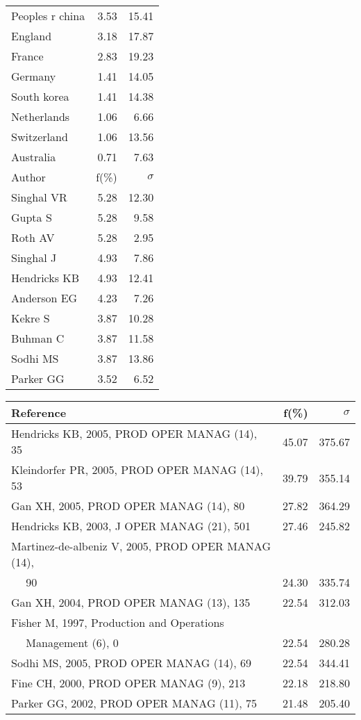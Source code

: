 \documentclass[a4paper,11pt]{report}
\begin{document}
\begin{landscape}
\begin{table}[!ht]
{\begin{tabular}{|l r r|}
Peoples r china & 3.53 & 15.41\\
England & 3.18 & 17.87\\
France & 2.83 & 19.23\\
Germany & 1.41 & 14.05\\
South korea & 1.41 & 14.38\\
Netherlands & 1.06 & 6.66\\
Switzerland & 1.06 & 13.56\\
Australia & 0.71 & 7.63\\
\hline
\hline
Author & f(\%) & $\sigma$\\
\hline
Singhal VR & 5.28 & 12.30\\
Gupta S & 5.28 & 9.58\\
Roth AV & 5.28 & 2.95\\
Singhal J & 4.93 & 7.86\\
Hendricks KB & 4.93 & 12.41\\
Anderson EG & 4.23 & 7.26\\
Kekre S & 3.87 & 10.28\\
Buhman C & 3.87 & 11.58\\
Sodhi MS & 3.87 & 13.86\\
Parker GG & 3.52 & 6.52\\
\hline
\end{tabular}
}
{\scriptsize\begin{tabular}{|l r r|}
\hline
Reference & f(\%) & $\sigma$\\
\hline
Hendricks KB, 2005, PROD OPER MANAG (14), 35 & 45.07 & 375.67\\
Kleindorfer PR, 2005, PROD OPER MANAG (14), 53 & 39.79 & 355.14\\
Gan XH, 2005, PROD OPER MANAG (14), 80 & 27.82 & 364.29\\
Hendricks KB, 2003, J OPER MANAG (21), 501 & 27.46 & 245.82\\
Martinez-de-albeniz V, 2005, PROD OPER MANAG (14), &  & \\
$\quad$ 90 & 24.30 & 335.74\\
Gan XH, 2004, PROD OPER MANAG (13), 135 & 22.54 & 312.03\\
Fisher M, 1997, Production and Operations &  & \\
$\quad$ Management (6), 0 & 22.54 & 280.28\\
Sodhi MS, 2005, PROD OPER MANAG (14), 69 & 22.54 & 344.41\\
Fine CH, 2000, PROD OPER MANAG (9), 213 & 22.18 & 218.80\\
Parker GG, 2002, PROD OPER MANAG (11), 75 & 21.48 & 205.40\\

\end{tabular}}
\end{table}
\end{landscape}
\end{document}
